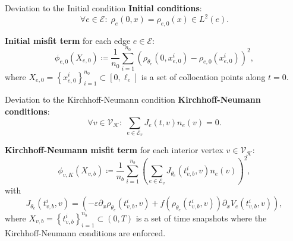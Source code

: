 \documentclass[9pt]{beamer}
\begin{document}
\begin{frame}{Deviation to the Initial condition}
    \textbf{Initial conditions}:
    \begin{equation*}
        \forall e \in \mathcal{E} \colon \; \rho_e \left( 0,x \right)  = \rho_{e, 0} \left( x \right) \in L^2 \left( e \right).
    \end{equation*}

    \vspace{3mm}

    \textbf{Initial misfit term} for each edge $e \in \mathcal{E}$:
    \begin{equation*} 
        \phi_{e,0}  \left( X_{e,0} \right) \coloneqq \frac{1}{n_0} \sum_{i=1}^{n_0}  \left( \rho_{\theta_e}  \left( 0,x_{e,0}^i \right) - \rho_{e,0} \left( x_{e,0}^i \right) \right)^2, 
    \end{equation*} 
    where $X_{e,0} = \left\{ x_{e,0}^i \right\}_{i=1}^{n_0} \subset \left[0, \ell_e\right]$ is a set of collocation points along $t=0$.
\end{frame}



\begin{frame}{Deviation to the Kirchhoff-Neumann condition}
    \textbf{Kirchhoff-Neumann conditions}:
    \begin{equation*}
        \forall v \in \mathcal{V}_\mathcal{K} \colon \; \sum_{e\in \mathcal{E}_v} J_e \left( t,v \right)  n_e  \left( v \right) =0.
    \end{equation*}
    
    \vspace{3mm}

    \textbf{Kirchhoff-Neumann misfit term} for each interior vertex $v \in \mathcal{V}_{\mathcal{K}}$:
    \begin{equation*} 
        \phi_{v,K}  \left( X_{v,b} \right) \coloneqq \frac{1}{n_b} \sum_{i=1}^{n_b}  \left( \sum_{e \in \mathcal{E}_v}  J_{\theta_e}\left( t_{v,b}^i, v \right)  n_e  \left( v \right) \right)^2, 
    \end{equation*} 
    with 
    \begin{equation*} 
        J_{\theta_e}\left( t_{v,b}^i, v \right) = \left( - \varepsilon \partial_x \rho_{\theta_e}  \left( t_{v,b}^i, v \right) + f \left( \rho_{\theta_e}  \left( t_{v,b}^i, v \right) \right) \partial_x V_e \left( t_{v,b}^i, v \right) \right),
    \end{equation*}
    where $X_{v,b} = \left\{ t_{v,b}^i \right\}_{i=1}^{n_b} \subset \left( 0,T \right)$ is a set of time snapshots where the Kirchhoff-Neumann conditions are enforced.
\end{frame}
\end{document}
